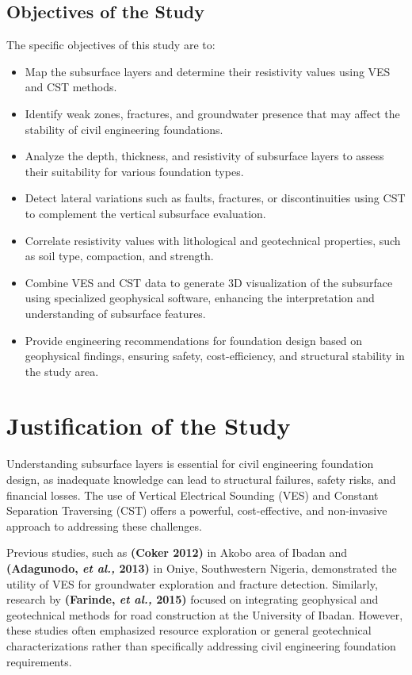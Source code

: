 \documentclass[12pt,a4paper]{report}
\begin{document}
\subsection{Objectives of the Study}
The specific objectives of this study are to:
\begin{itemize}
    \item Map the subsurface layers and determine their resistivity values using VES and CST methods.
    \item Identify weak zones, fractures, and groundwater presence that may affect the stability of civil engineering foundations.
    \item Analyze the depth, thickness, and resistivity of subsurface layers to assess their suitability for various foundation types.
    \item Detect lateral variations such as faults, fractures, or discontinuities using CST to complement the vertical subsurface evaluation.
    \item Correlate resistivity values with lithological and geotechnical properties, such as soil type, compaction, and strength.
    \item Combine VES and CST data to generate 3D visualization of the subsurface using specialized geophysical software, enhancing the interpretation and understanding of subsurface features.
    \item Provide engineering recommendations for foundation design based on geophysical findings, ensuring safety, cost-efficiency, and structural stability in the study area.
\end{itemize}

\section{Justification of the Study}
Understanding subsurface layers is essential for civil engineering foundation design, as inadequate knowledge can lead to structural failures, safety risks, and financial losses. The use of Vertical Electrical Sounding (VES) and Constant Separation Traversing (CST) offers a powerful, cost-effective, and non-invasive approach to addressing these challenges.

Previous studies, such as \textbf{(Coker 2012)} in Akobo area of Ibadan and \textbf{(Adagunodo, \textit{et al.,} 2013)} in Oniye, Southwestern Nigeria, demonstrated the utility of VES for groundwater exploration and fracture detection. Similarly, research by \textbf{(Farinde, \textit{et al.,} 2015)} focused on integrating geophysical and geotechnical methods for road construction at the University of Ibadan. However, these studies often emphasized resource exploration or general geotechnical characterizations rather than specifically addressing civil engineering foundation requirements.
\end{document}
